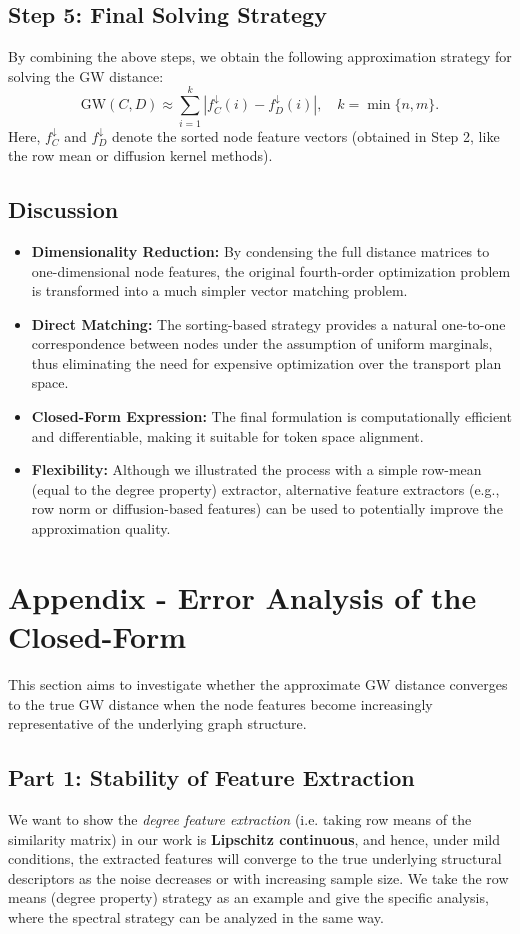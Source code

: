 \documentclass{article}
\begin{document}
\subsection*{Step 5: Final Solving Strategy}
By combining the above steps, we obtain the following approximation strategy for solving the GW distance:
\[
{\text{GW}}(C,D) \approx \sum_{i=1}^{k} \left| f_C^{\downarrow}(i) - f_D^{\downarrow}(i) \right|,\quad k = \min\{n, m\}. 
\]
Here, \( f_C^{\downarrow} \) and \( f_D^{\downarrow} \) denote the sorted node feature vectors (obtained in Step 2, like the row mean or diffusion kernel methods).

\subsection{Discussion}
\begin{itemize}
    \item \textbf{Dimensionality Reduction:} By condensing the full distance matrices to one-dimensional node features, the original fourth-order optimization problem is transformed into a much simpler vector matching problem.
    \item \textbf{Direct Matching:} The sorting-based strategy provides a natural one-to-one correspondence between nodes under the assumption of uniform marginals, thus eliminating the need for expensive optimization over the transport plan space.
    \item \textbf{Closed-Form Expression:} The final formulation is computationally efficient and differentiable, making it suitable for token space alignment.
    \item \textbf{Flexibility:} Although we illustrated the process with a simple row-mean (equal to the degree property) extractor, alternative feature extractors (e.g., row norm or diffusion-based features) can be used to potentially improve the approximation quality.
\end{itemize}



\section{Appendix - Error Analysis of the Closed-Form}
\label{Appendix - Error Analysis of the Closed-Form}
This section aims to investigate whether the approximate GW distance converges to the true GW distance when the node features become increasingly representative of the underlying graph structure. 

\subsection{Part 1: Stability of Feature Extraction}
\label{feature extraction error}
We want to show the \textit{ degree feature extraction } (i.e. taking row means of the similarity matrix) in our work is \textbf{Lipschitz continuous}, and hence, under mild conditions, the extracted features will converge to the true underlying structural descriptors as the noise decreases or with increasing sample size. We take the row means (degree property) strategy as an example and give the specific analysis, where the spectral strategy can be analyzed in the same way.
\end{document}

